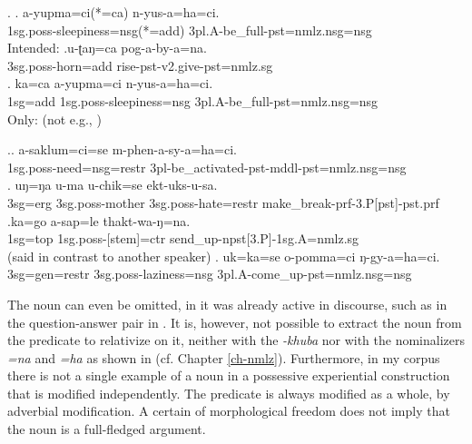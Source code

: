 \ex. \ag. a-yupma=ci(*=ca) n-yus-a=ha=ci.\\
	{\sc 1sg.poss}-sleepiness{\sc =nsg(*=add)} {\sc 3pl.A}-be\_full{\sc -pst=nmlz.nsg=nsg}\\
	Intended:  
	\bg.u-ʈaŋ=ca pog-a-by-a=na.\\
	{\sc 3sg.poss-}horn{\sc =add} rise{\sc [3sg]-pst-v2.give-pst=nmlz.sg}\\
	\bg. ka=ca a-yupma=ci n-yus-a=ha=ci.\label{kacaayupma}\\
	{\sc 1sg=add} {\sc 1sg.poss}-sleepiness{\sc =nsg} {\sc 3pl.A}-be\_full{\sc -pst=nmlz.nsg=nsg}\\
	Only:   (not e.g., )
	

\ex.\ag. a-saklum=ci=se m-phen-a-sy-a=ha=ci.\\
{\sc 1sg.poss}-need{\sc =nsg=restr} {\sc 3pl}-be\_activated-{\sc pst-mddl-pst=nmlz.nsg=nsg}	\\
\bg. uŋ=ŋa   u-ma             u-chik=se  ekt-uks-u-sa.\\
{\sc 3sg=erg} {\sc 3sg.poss-}mother {\sc 3sg.poss-}hate{\sc =restr} make\_break{\sc -prf-3.P[pst]-pst.prf}\\
\bg.ka=go a-sap=le thakt-wa-ŋ=na.\\
{\sc 1sg=top} {\sc 1sg.poss-}[stem]{\sc =ctr} send\_up{\sc -npst[3.P]-1sg.A=nmlz.sg}\\
 (said in contrast to another speaker)
\bg.  uk=ka=se  o-pomma=ci ŋ-gy-a=ha=ci.\label{ukkaseopomma}\\
{\sc 3sg=gen=restr} {\sc 3sg.poss-}laziness{\sc =nsg} {\sc 3pl.A}-come\_up{\sc -pst=nmlz.nsg=nsg}\\


The noun can even be omitted, in  it was already active in discourse, such as in the question-answer pair in \Next. It is, however, not possible to extract the noun from the predicate to relativize on it, neither with the  \emph{-khuba} nor with the  nominalizers \emph{=na} and \emph{=ha} as shown in \NNext (cf. Chapter \ref{ch-nmlz}).  Furthermore, in my corpus there is not a single example of a noun in a possessive experiential construction that is modified independently. The predicate is always modified as a whole, by adverbial modification. A certain  of  morphological freedom does not imply that the noun is a full-fledged argument.


